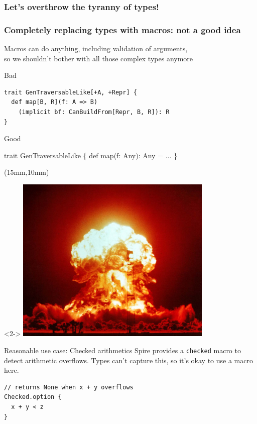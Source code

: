 \documentclass{beamer}
\begin{document}
\begin{frame}[fragile]
\frametitle<1>{Let's overthrow the tyranny of types!}
\frametitle<2>{Completely replacing types with macros: not a good idea}
  Macros can do anything, including validation of arguments,\\
  so we shouldn't bother with all those complex types anymore

  \vspace{1em}
  \begin{alertblock}{Bad}
    \begin{verbatim}
trait GenTraversableLike[+A, +Repr] {
  def map[B, R](f: A => B)
    (implicit bf: CanBuildFrom[Repr, B, R]): R
}
    \end{verbatim}
  \end{alertblock}

  \begin{exampleblock}{Good}
    \begin{semiverbatim}
trait GenTraversableLike \{
  def map(f: Any): Any = \text{\color{blue}{macro}} ...
\}
    \end{semiverbatim}
  \end{exampleblock}

  \begin{textblock*}{\textwidth}(15mm,10mm)
    \begin{visibleenv}<2->
      \includegraphics[height=8cm]{img/boom.jpg}
    \end{visibleenv}
  \end{textblock*}
\end{frame}

\begin{frame}[fragile]{Reasonable use case: Checked arithmetics}
  Spire provides a \texttt{checked} macro to detect arithmetic overflows.
  Types can't capture this, so it's okay to use a macro here.

  \vspace{1em}
  \begin{verbatim}
// returns None when x + y overflows
Checked.option {
  x + y < z
}
  \end{verbatim}
\end{frame}
\end{document}
